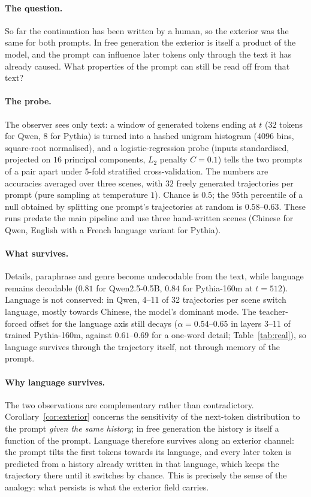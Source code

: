 \documentclass[11pt]{article}
\theoremstyle{definition}
\theoremstyle{remark}
\begin{document}
\paragraph{The question.} So far the continuation has been written by a human, so the exterior was the same for both prompts. In free generation the exterior is itself a product of the model, and the prompt can influence later tokens only through the text it has already caused. What properties of the prompt can still be read off from that text?

\paragraph{The probe.} The observer sees only text: a window of generated tokens ending at $t$ ($32$ tokens for Qwen, $8$ for Pythia) is turned into a hashed unigram histogram ($4096$ bins, square-root normalised), and a logistic-regression probe (inputs standardised, projected on $16$ principal components, $L_2$ penalty $C=0.1$) tells the two prompts of a pair apart under 5-fold stratified cross-validation. The numbers are accuracies averaged over three scenes, with $32$ freely generated trajectories per prompt (pure sampling at temperature $1$). Chance is $0.5$; the 95th percentile of a null obtained by splitting one prompt's trajectories at random is $0.58$--$0.63$. These runs predate the main pipeline and use three hand-written scenes (Chinese for Qwen, English with a French language variant for Pythia).

\paragraph{What survives.} Details, paraphrase and genre become undecodable from the text, while language remains decodable ($0.81$ for Qwen2.5-0.5B, $0.84$ for Pythia-160m at $t=512$). Language is not conserved: in Qwen, 4--11 of 32 trajectories per scene switch language, mostly towards Chinese, the model's dominant mode. The teacher-forced offset for the language axis still decays ($\alpha=0.54$--$0.65$ in layers 3--11 of trained Pythia-160m, against $0.61$--$0.69$ for a one-word detail; Table~\ref{tab:real}), so language survives through the trajectory itself, not through memory of the prompt.

\paragraph{Why language survives.} The two observations are complementary rather than contradictory. Corollary~\ref{cor:exterior} concerns the sensitivity of the next-token distribution to the prompt \emph{given the same history}; in free generation the history is itself a function of the prompt. Language therefore survives along an exterior channel: the prompt tilts the first tokens towards its language, and every later token is predicted from a history already written in that language, which keeps the trajectory there until it switches by chance. This is precisely the sense of the analogy: what persists is what the exterior field carries.
\end{document}

